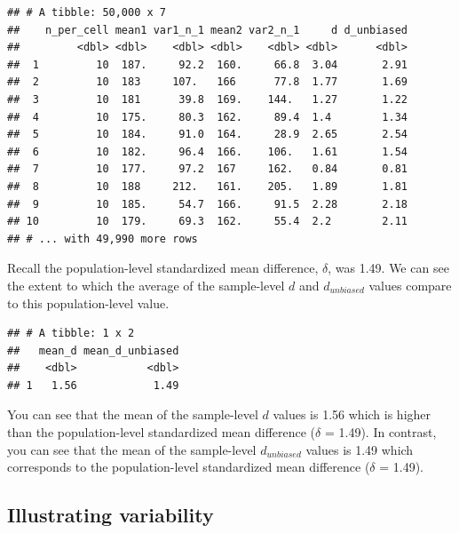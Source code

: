 \documentclass[
]{krantz}
\makeatletter
\newenvironment{Shaded}{\begin{snugshade}}{\end{snugshade}}
\newcommand{\DataTypeTok}[1]{\textcolor[rgb]{0.27,0.27,0.27}{#1}}
\newcommand{\KeywordTok}[1]{\textcolor[rgb]{0.27,0.27,0.27}{\textbf{#1}}}
\newcommand{\NormalTok}[1]{#1}
\newcommand{\OperatorTok}[1]{\textcolor[rgb]{0.43,0.43,0.43}{\textbf{#1}}}
\newcommand{\StringTok}[1]{\textcolor[rgb]{0.5,0.5,0.5}{#1}}
\newenvironment{kframe}{%
\medskip{}
\setlength{\fboxsep}{.8em}
 \def\at@end@of@kframe{}%
 \ifinner\ifhmode%
  \def\at@end@of@kframe{\end{minipage}}%
  \begin{minipage}{\columnwidth}%
 \fi\fi%
 \def\FrameCommand##1{\hskip\@totalleftmargin \hskip-\fboxsep
 \colorbox{shadecolor}{##1}\hskip-\fboxsep
     \hskip-\linewidth \hskip-\@totalleftmargin \hskip\columnwidth}%
 \MakeFramed {\advance\hsize-\width
   \@totalleftmargin\z@ \linewidth\hsize
   \@setminipage}}%
 {\par\unskip\endMakeFramed%
 \at@end@of@kframe}
\renewenvironment{Shaded}{\begin{kframe}}{\end{kframe}}
\makeatother
\begin{document}
\begin{verbatim}
## # A tibble: 50,000 x 7
##    n_per_cell mean1 var1_n_1 mean2 var2_n_1     d d_unbiased
##         <dbl> <dbl>    <dbl> <dbl>    <dbl> <dbl>      <dbl>
##  1         10  187.     92.2  160.     66.8  3.04       2.91
##  2         10  183     107.   166      77.8  1.77       1.69
##  3         10  181      39.8  169.    144.   1.27       1.22
##  4         10  175.     80.3  162.     89.4  1.4        1.34
##  5         10  184.     91.0  164.     28.9  2.65       2.54
##  6         10  182.     96.4  166.    106.   1.61       1.54
##  7         10  177.     97.2  167     162.   0.84       0.81
##  8         10  188     212.   161.    205.   1.89       1.81
##  9         10  185.     54.7  166.     91.5  2.28       2.18
## 10         10  179.     69.3  162.     55.4  2.2        2.11
## # ... with 49,990 more rows
\end{verbatim}

Recall the population-level standardized mean difference, \(\delta\), was 1.49. We can see the extent to which the average of the sample-level \(d\) and \(d_{unbiased}\) values compare to this population-level value.

\begin{Shaded}
\end{Shaded}

\begin{verbatim}
## # A tibble: 1 x 2
##   mean_d mean_d_unbiased
##    <dbl>           <dbl>
## 1   1.56            1.49
\end{verbatim}

You can see that the mean of the sample-level \(d\) values is 1.56 which is higher than the population-level standardized mean difference (\(\delta\) = 1.49). In contrast, you can see that the mean of the sample-level \(d_{unbiased}\) values is 1.49 which corresponds to the population-level standardized mean difference (\(\delta\) = 1.49).

\hypertarget{illustrating-variability}{%
\subsection{Illustrating variability}\label{illustrating-variability}}
\end{document}
